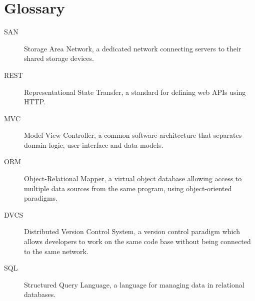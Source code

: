 \chapter*{Glossary}

\begin{description}
\item[SAN]
    Storage Area Network, a dedicated network connecting servers to their
    shared storage devices. \cite{ward2002}
\item[REST]
    Representational State Transfer, a standard for defining web APIs using
    HTTP.
\item[MVC]
    Model View Controller, a common software architecture that separates domain
    logic, user interface and data models.
\item[ORM]
    Object-Relational Mapper, a virtual object database allowing access to
    multiple data sources from the same program, using object-oriented
    paradigms.
\item[DVCS]
    Distributed Version Control System, a version control paradigm which allows
    developers to work on the same code base without being connected to the
    same network.
\item[SQL]
    Structured Query Language, a language for managing data in relational
    databases.
\end{description}
